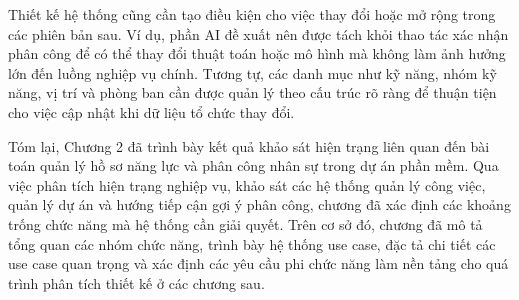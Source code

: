 \documentclass[../DoAn.tex]{subfiles}
\begin{document}
Thiết kế hệ thống cũng cần tạo điều kiện cho việc thay đổi hoặc mở rộng trong các phiên bản sau. Ví dụ, phần AI đề xuất nên được tách khỏi thao tác xác nhận phân công để có thể thay đổi thuật toán hoặc mô hình mà không làm ảnh hưởng lớn đến luồng nghiệp vụ chính. Tương tự, các danh mục như kỹ năng, nhóm kỹ năng, vị trí và phòng ban cần được quản lý theo cấu trúc rõ ràng để thuận tiện cho việc cập nhật khi dữ liệu tổ chức thay đổi.

Tóm lại, Chương 2 đã trình bày kết quả khảo sát hiện trạng liên quan đến bài toán quản lý hồ sơ năng lực và phân công nhân sự trong dự án phần mềm. Qua việc phân tích hiện trạng nghiệp vụ, khảo sát các hệ thống quản lý công việc, quản lý dự án và hướng tiếp cận gợi ý phân công, chương đã xác định các khoảng trống chức năng mà hệ thống cần giải quyết. Trên cơ sở đó, chương đã mô tả tổng quan các nhóm chức năng, trình bày hệ thống use case, đặc tả chi tiết các use case quan trọng và xác định các yêu cầu phi chức năng làm nền tảng cho quá trình phân tích thiết kế ở các chương sau.


\end{document}
